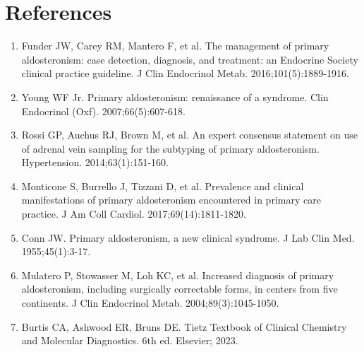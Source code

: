 \section*{References}
\begin{enumerate}
  \item Funder JW, Carey RM, Mantero F, et al. The management of primary aldosteronism: case detection, diagnosis, and treatment: an Endocrine Society clinical practice guideline. J Clin Endocrinol Metab. 2016;101(5):1889-1916.
  \item Young WF Jr. Primary aldosteronism: renaissance of a syndrome. Clin Endocrinol (Oxf). 2007;66(5):607-618.
  \item Rossi GP, Auchus RJ, Brown M, et al. An expert consensus statement on use of adrenal vein sampling for the subtyping of primary aldosteronism. Hypertension. 2014;63(1):151-160.
  \item Monticone S, Burrello J, Tizzani D, et al. Prevalence and clinical manifestations of primary aldosteronism encountered in primary care practice. J Am Coll Cardiol. 2017;69(14):1811-1820.
  \item Conn JW. Primary aldosteronism, a new clinical syndrome. J Lab Clin Med. 1955;45(1):3-17.
  \item Mulatero P, Stowasser M, Loh KC, et al. Increased diagnosis of primary aldosteronism, including surgically correctable forms, in centers from five continents. J Clin Endocrinol Metab. 2004;89(3):1045-1050.
  \item Burtis CA, Ashwood ER, Bruns DE. Tietz Textbook of Clinical Chemistry and Molecular Diagnostics. 6th ed. Elsevier; 2023.
\end{enumerate}

\clearpage
